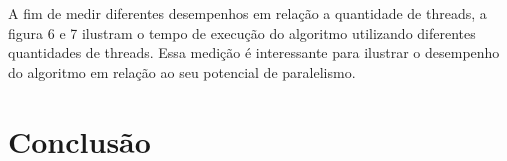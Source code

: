 \documentclass[12pt]{article}
\begin{document}
A fim de medir diferentes desempenhos em relação a quantidade de threads, a figura 6 e 7 ilustram o tempo de execução do algoritmo utilizando diferentes quantidades de threads. Essa medição é interessante para ilustrar o desempenho do algoritmo em relação ao seu potencial de paralelismo. 





\section{Conclusão}

{\color{gray}\lipsum[1]}





\end{document}
